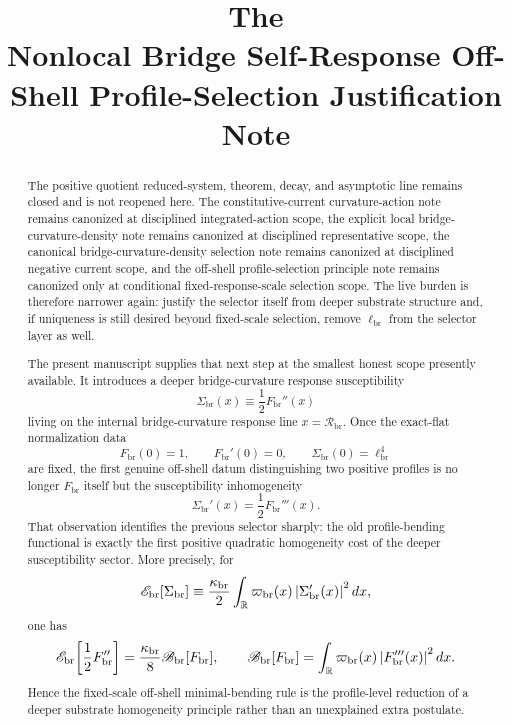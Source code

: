 \documentclass[11pt]{article}
\title{\textbf{The \TheoryName{}}\\[0.4em]
\large Nonlocal Bridge Self-Response Off-Shell Profile-Selection Justification Note}
\author{}
\date{}
\newcommand{\CurvScale}{\ell_{\mathrm{br}}}
\newcommand{\CurvProfile}{F_{\mathrm{br}}}
\newcommand{\BridgeCurv}{\mathcal R_{\mathrm{br}}}
\newcommand{\ProfWeight}{\varpi_{\mathrm{br}}}
\newcommand{\ProfBend}{\mathscr B_{\mathrm{br}}}
\newcommand{\RespSus}{\Sigma_{\mathrm{br}}}
\newcommand{\RespEnergy}{\mathscr E_{\mathrm{br}}}
\newcommand{\RespStiff}{\kappa_{\mathrm{br}}}
\begin{document}
\maketitle

\begin{abstract}
The positive quotient reduced-system, theorem, decay, and asymptotic line remains closed and is not reopened here. The constitutive-current curvature-action note remains canonized at disciplined integrated-action scope, the explicit local bridge-curvature-density note remains canonized at disciplined representative scope, the canonical bridge-curvature-density selection note remains canonized at disciplined negative current scope, and the off-shell profile-selection principle note remains canonized only at conditional fixed-response-scale selection scope. The live burden is therefore narrower again: justify the selector itself from deeper substrate structure and, if uniqueness is still desired beyond fixed-scale selection, remove \(\CurvScale\) from the selector layer as well.

The present manuscript supplies that next step at the smallest honest scope presently available. It introduces a deeper bridge-curvature response susceptibility
\[
\RespSus(x)\equiv \frac12 \CurvProfile''(x)
\]
living on the internal bridge-curvature response line \(x=\BridgeCurv\). Once the exact-flat normalization data
\[
\CurvProfile(0)=1,
\qquad
\CurvProfile'(0)=0,
\qquad
\RespSus(0)=\CurvScale^4
\]
are fixed, the first genuine off-shell datum distinguishing two positive profiles is no longer \(\CurvProfile\) itself but the susceptibility inhomogeneity
\[
\RespSus'(x)=\frac12\CurvProfile'''(x).
\]
That observation identifies the previous selector sharply: the old profile-bending functional is exactly the first positive quadratic homogeneity cost of the deeper susceptibility sector. More precisely, for
\[
\RespEnergy[\RespSus]
\equiv
\frac{\RespStiff}{2}\int_{\mathbb R}\ProfWeight(x)\,\abs{\RespSus'(x)}^2\,dx,
\]
one has
\[
\RespEnergy\!\left[\frac12\CurvProfile''\right]
=
\frac{\RespStiff}{8}\ProfBend[\CurvProfile],
\qquad
\ProfBend[\CurvProfile]
=
\int_{\mathbb R}\ProfWeight(x)\,\abs{\CurvProfile'''(x)}^2\,dx.
\]
Hence the fixed-scale off-shell minimal-bending rule is the profile-level reduction of a deeper substrate homogeneity principle rather than an unexplained extra postulate.


\end{abstract}
\end{document}
